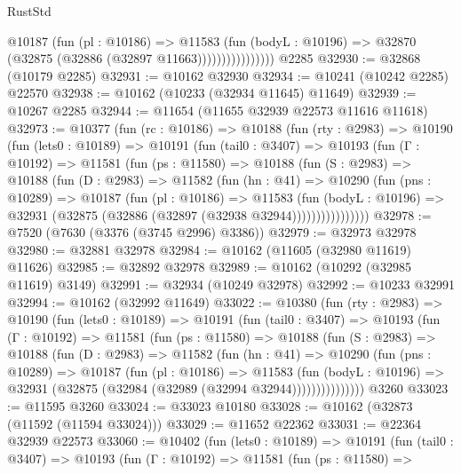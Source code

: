 \begin{lexlean}{RustStd}
\begin{coremodule}
                        @10187
                          (fun (pl : @10186) =>
                          @11583
                            (fun (bodyL : @10196) =>
                            @32870 (@32875 (@32886 (@32897 @11663))))))))))))))))
    @2285
@32930 := @32868 (@10179 @2285)
@32931 := @10162 @32930
@32934 := @10241 (@10242 @2285) @22570
@32938 := @10162 (@10233 (@32934 @11645) @11649)
@32939 := @10267 @2285
@32944 := @11654 (@11655 @32939 @22573 @11616 @11618)
@32973 := @10377
    (fun (rc : @10186) =>
    @10188
      (fun (rty : @2983) =>
      @10190
        (fun (lets0 : @10189) =>
        @10191
          (fun (tail0 : @3407) =>
          @10193
            (fun (Γ : @10192) =>
            @11581
              (fun (ps : @11580) =>
              @10188
                (fun (S : @2983) =>
                @10188
                  (fun (D : @2983) =>
                  @11582
                    (fun (hn : @41) =>
                    @10290
                      (fun (pns : @10289) =>
                      @10187
                        (fun (pl : @10186) =>
                        @11583
                          (fun (bodyL : @10196) =>
                          @32931 (@32875 (@32886 (@32897 (@32938 @32944))))))))))))))))
@32978 := @7520 (@7630 (@3376 (@3745 @2996) @3386))
@32979 := @32973 @32978
@32980 := @32881 @32978
@32984 := @10162 (@11605 (@32980 @11619) @11626)
@32985 := @32892 @32978
@32989 := @10162 (@10292 (@32985 @11619) @3149)
@32991 := @32934 (@10249 @32978)
@32992 := @10233 @32991
@32994 := @10162 (@32992 @11649)
@33022 := @10380
    (fun (rty : @2983) =>
    @10190
      (fun (lets0 : @10189) =>
      @10191
        (fun (tail0 : @3407) =>
        @10193
          (fun (Γ : @10192) =>
          @11581
            (fun (ps : @11580) =>
            @10188
              (fun (S : @2983) =>
              @10188
                (fun (D : @2983) =>
                @11582
                  (fun (hn : @41) =>
                  @10290
                    (fun (pns : @10289) =>
                    @10187
                      (fun (pl : @10186) =>
                      @11583
                        (fun (bodyL : @10196) =>
                        @32931 (@32875 (@32984 (@32989 (@32994 @32944)))))))))))))))
    @3260
@33023 := @11595 @3260
@33024 := @33023 @10180
@33028 := @10162 (@32873 (@11592 (@11594 @33024)))
@33029 := @11652 @22362
@33031 := @22364 @32939 @22573
@33060 := @10402
    (fun (lets0 : @10189) =>
    @10191
      (fun (tail0 : @3407) =>
      @10193
        (fun (Γ : @10192) =>
        @11581
          (fun (ps : @11580) =>

\end{coremodule}
\end{lexlean}

